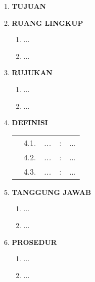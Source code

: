 \documentclass[12pt]{etc.doc}
\begin{document}
    \begin{enumerate}
        \item \textbf{TUJUAN}\\\vspace{1ex} 

        \item \textbf{RUANG LINGKUP}
            \begin{enumerate}
                \item ...
                \item ...
            \end{enumerate}

        \item \textbf{RUJUKAN}
            \begin{enumerate}
                \item ...
                \item ...
            \end{enumerate}

        \item \textbf{DEFINISI}
            \begin{longtable}{p{8pt} r p{3cm} c p{10.98cm}}
                & 4.1. & \textit{...} & : & ...\\
                & 4.2. & \textit{...} & : & ...\\
                & 4.3. & \textit{...} & : & ...\\
            \end{longtable}

        \item \textbf{TANGGUNG JAWAB}
            \begin{enumerate}
                \item ...
                \item ...
            \end{enumerate}

        \item \textbf{PROSEDUR}
            \begin{enumerate}
                \item ...
                \item ...
            \end{enumerate}
    \end{enumerate}
\end{document}
